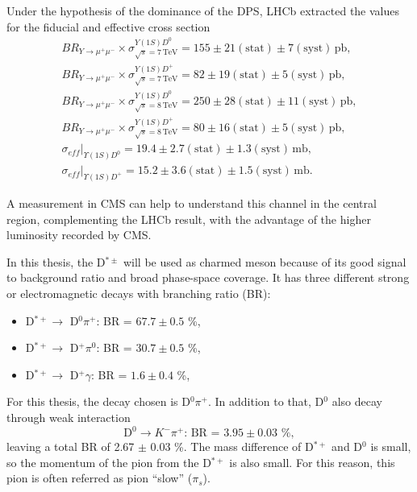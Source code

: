 Under the hypothesis of the dominance of the DPS, LHCb extracted the values for the fiducial and effective cross section
\begin{equation}
\begin{split}
    BR_{Y \rightarrow \mu^+\mu^-} \times \sigma^{Y(1S)D^0}_{\sqrt{s}=7\, \text{TeV}} = 155 \pm 21 (\text{stat}) \pm 7(\text{syst}) \, \text{pb}, \\
    BR_{Y \rightarrow \mu^+\mu^-} \times \sigma^{Y(1S)D^+}_{\sqrt{s}=7\, \text{TeV}} = 82 \pm 19 (\text{stat}) \pm 5(\text{syst}) \, \text{pb}, \\
    BR_{Y \rightarrow \mu^+\mu^-} \times \sigma^{Y(1S)D^0}_{\sqrt{s}=8\, \text{TeV}} = 250 \pm 28 (\text{stat}) \pm 11(\text{syst}) \, \text{pb}, \\
    BR_{Y \rightarrow \mu^+\mu^-} \times \sigma^{Y(1S)D^+}_{\sqrt{s}=8\, \text{TeV}} = 80 \pm 16 (\text{stat}) \pm 5(\text{syst}) \, \text{pb}, \\
    \sigma_{eff}|_{\Upsilon(1S)D^0} = 19.4 \pm 2.7 (\text{stat}) \pm 1.3 (\text{syst}) \, \text{mb}, \\
    \sigma_{eff}|_{\Upsilon(1S)D^+} = 15.2 \pm 3.6 (\text{stat}) \pm 1.5 (\text{syst}) \, \text{mb}. 
\end{split}
\end{equation}

A measurement in CMS can help to understand this channel in the central region, complementing the LHCb result, with the advantage of the higher luminosity recorded by CMS.

In this thesis, the D$^{*\pm}$ will be used as charmed meson because of its good signal to background ratio and broad phase-space coverage. It has three different strong or electromagnetic decays \cite{Workman:2022ynf} with branching ratio (BR):
\begin{itemize}
    \item D$^{*+} \rightarrow$ D$^0 \pi^+$: BR = $67.7 \pm 0.5$ \%,
    \item D$^{*+} \rightarrow$ D$^+ \pi^0$: BR = $30.7 \pm 0.5$ \%,
    \item D$^{*+} \rightarrow$ D$^+ \gamma$: BR = $1.6 \pm 0.4$ \%,
\end{itemize}

For this thesis, the decay chosen is D$^0 \pi^+$. In addition to that, D$^0$ also decay through weak interaction
\begin{equation*}
    \text{D}^0 \rightarrow K^- \pi^+\text{: BR = } 3.95\pm0.03\text{ \%},
\end{equation*}
leaving a total BR of 2.67 $\pm$ 0.03 \%. The mass difference of D$^{*+}$ and D$^0$ is small, so the momentum of the pion from the D$^{*+}$ is also small. For this reason, this pion is often referred as pion ``slow'' ($\pi_s$).

